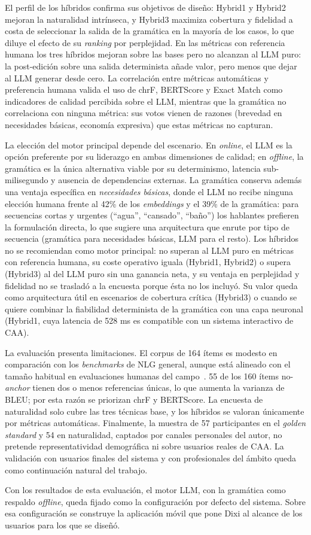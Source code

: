 El perfil de los híbridos confirma sus objetivos de diseño: Hybrid1 y Hybrid2 mejoran la naturalidad intrínseca, y Hybrid3 maximiza cobertura y fidelidad a costa de seleccionar la salida de la gramática en la mayoría de los casos, lo que diluye el efecto de su \textit{ranking} por perplejidad. En las métricas con referencia humana los tres híbridos mejoran sobre las bases pero no alcanzan al LLM puro: la post-edición sobre una salida determinista añade valor, pero menos que dejar al LLM generar desde cero. La correlación entre métricas automáticas y preferencia humana valida el uso de chrF, BERTScore y Exact Match como indicadores de calidad percibida sobre el LLM, mientras que la gramática no correlaciona con ninguna métrica: sus votos vienen de razones (brevedad en necesidades básicas, economía expresiva) que estas métricas no capturan.

La elección del motor principal depende del escenario. En \textit{online}, el LLM es la opción preferente por su liderazgo en ambas dimensiones de calidad; en \textit{offline}, la gramática es la única alternativa viable por su determinismo, latencia sub-milisegundo y ausencia de dependencias externas. La gramática conserva además una ventaja específica en \textit{necesidades básicas}, donde el LLM no recibe ninguna elección humana frente al 42\% de los \textit{embeddings} y el 39\% de la gramática: para secuencias cortas y urgentes (``agua'', ``cansado'', ``baño'') los hablantes prefieren la formulación directa, lo que sugiere una arquitectura que enrute por tipo de secuencia (gramática para necesidades básicas, LLM para el resto). Los híbridos no se recomiendan como motor principal: no superan al LLM puro en métricas con referencia humana, su coste operativo iguala (Hybrid1, Hybrid2) o supera (Hybrid3) al del LLM puro sin una ganancia neta, y su ventaja en perplejidad y fidelidad no se trasladó a la encuesta porque ésta no los incluyó. Su valor queda como arquitectura útil en escenarios de cobertura crítica (Hybrid3) o cuando se quiere combinar la fiabilidad determinista de la gramática con una capa neuronal (Hybrid1, cuya latencia de 528 ms es compatible con un sistema interactivo de CAA).

La evaluación presenta limitaciones. El corpus de 164 ítems es modesto en comparación con los \textit{benchmarks} de NLG general, aunque está alineado con el tamaño habitual en evaluaciones humanas del campo~\cite{reiter2009investigation}. 55 de los 160 ítems no-\textit{anchor} tienen dos o menos referencias únicas, lo que aumenta la varianza de BLEU; por esta razón se priorizan chrF y BERTScore. La encuesta de naturalidad solo cubre las tres técnicas base, y los híbridos se valoran únicamente por métricas automáticas. Finalmente, la muestra de 57 participantes en el \textit{golden standard} y 54 en naturalidad, captados por canales personales del autor, no pretende representatividad demográfica ni sobre usuarios reales de CAA. La validación con usuarios finales del sistema y con profesionales del ámbito queda como continuación natural del trabajo.

Con los resultados de esta evaluación, el motor LLM, con la gramática como respaldo \textit{offline}, queda fijado como la configuración por defecto del sistema. Sobre esa configuración se construye la aplicación móvil que pone Dixi al alcance de los usuarios para los que se diseñó.
